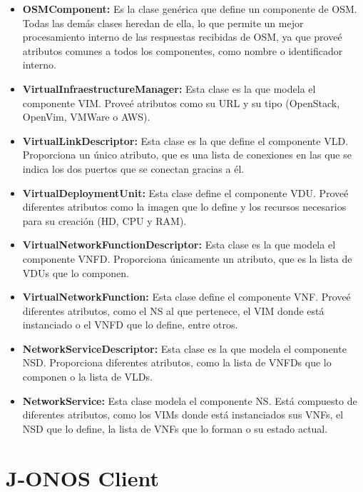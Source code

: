 \begin{itemize}
	\item \textbf{OSMComponent:} Es la clase genérica que define un componente de \ac{OSM}. Todas las demás clases heredan de ella, lo que permite un mejor procesamiento interno de las respuestas recibidas de \ac{OSM}, ya que proveé atributos comunes a todos los componentes, como nombre o identificador interno.
	
	\item \textbf{VirtualInfraestructureManager:} Esta clase es la que modela el componente \ac{VIM}. Proveé atributos como su \ac{URL} y su tipo (OpenStack, OpenVim, VMWare o \ac{AWS}).
	
	\item \textbf{VirtualLinkDescriptor:} Esta clase es la que define el componente \ac{VLD}. Proporciona un único atributo, que es una lista de conexiones en las que se indica los dos puertos que se conectan gracias a él.
	
	\item \textbf{VirtualDeploymentUnit:} Esta clase define el componente \ac{VDU}. Proveé diferentes atributos como la imagen que lo define y los recursos necesarios para su creación (\ac{HD}, \ac{CPU} y \ac{RAM}).
	
	\item \textbf{VirtualNetworkFunctionDescriptor:} Esta clase es la que modela el componente \ac{VNFD}. Proporciona únicamente un atributo, que es la lista de \acp{VDU} que lo componen.
		
	\item \textbf{VirtualNetworkFunction:} Esta clase define el componente \ac{VNF}. Proveé diferentes atributos, como el \ac{NS} al que pertenece, el \ac{VIM} donde está instanciado o el \ac{VNFD} que lo define, entre otros.
	
	\item \textbf{NetworkServiceDescriptor:} Esta clase es la que modela el componente \ac{NSD}. Proporciona diferentes atributos, como la lista de \acp{VNFD} que lo componen o la lista de \acp{VLD}.
	
	\item \textbf{NetworkService:} Esta clase modela el componente \ac{NS}. Está compuesto de diferentes atributos, como los \acp{VIM} donde está instanciados sus \acp{VNF}, el \ac{NSD} que lo define, la lista de \acp{VNF} que lo forman o su estado actual.
	
\end{itemize}


\section{J-ONOS Client}
\label{sec:onosclient}


